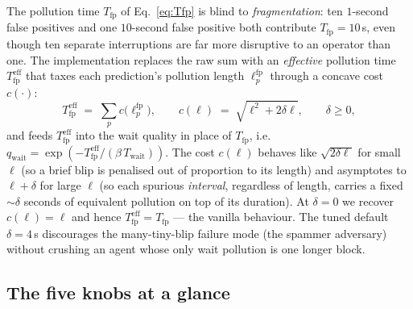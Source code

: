 \documentclass[11pt]{article}
\newcommand{\Twait}{T_{\text{wait}}}
\newcommand{\Tfp}{T_{\text{fp}}}
\newcommand{\qwait}{q_{\text{wait}}}
\begin{document}
The pollution time $\Tfp$ of Eq.~\eqref{eq:Tfp} is blind to
\emph{fragmentation}: ten $1$-second false positives and one
$10$-second false positive both contribute $\Tfp = 10$\,s, even
though ten separate interruptions are far more disruptive to an
operator than one. The implementation replaces the raw sum with an
\emph{effective} pollution time $\Tfp^{\text{eff}}$ that taxes each
prediction's pollution length $\ell_p^{\text{fp}}$ through a concave
cost $c(\cdot)$:
\begin{equation}
  \Tfp^{\text{eff}} \;=\; \sum_{p} c\!\bigl(\ell_p^{\text{fp}}\bigr),
  \qquad
  c(\ell) \;=\; \sqrt{\ell^2 + 2\delta\ell},
  \qquad \delta \ge 0,
  \label{eq:blip}
\end{equation}
and feeds $\Tfp^{\text{eff}}$ into the wait quality in place of $\Tfp$,
i.e. $\qwait = \exp(-\Tfp^{\text{eff}} / (\beta\,\Twait))$. The cost
$c(\ell)$ behaves like $\sqrt{2\delta\ell}$ for small $\ell$ (so a
brief blip is penalised out of proportion to its length) and
asymptotes to $\ell + \delta$ for large $\ell$ (so each spurious
\emph{interval}, regardless of length, carries a fixed $\sim\!\delta$
seconds of equivalent pollution on top of its duration). At $\delta =
0$ we recover $c(\ell) = \ell$ and hence $\Tfp^{\text{eff}} = \Tfp$ ---
the vanilla behaviour. The tuned default $\delta = 4$\,s discourages
the many-tiny-blip failure mode (the spammer adversary) without
crushing an agent whose only wait pollution is one longer block.

\subsection{The five knobs at a glance}
\label{sec:knobs}
\end{document}
